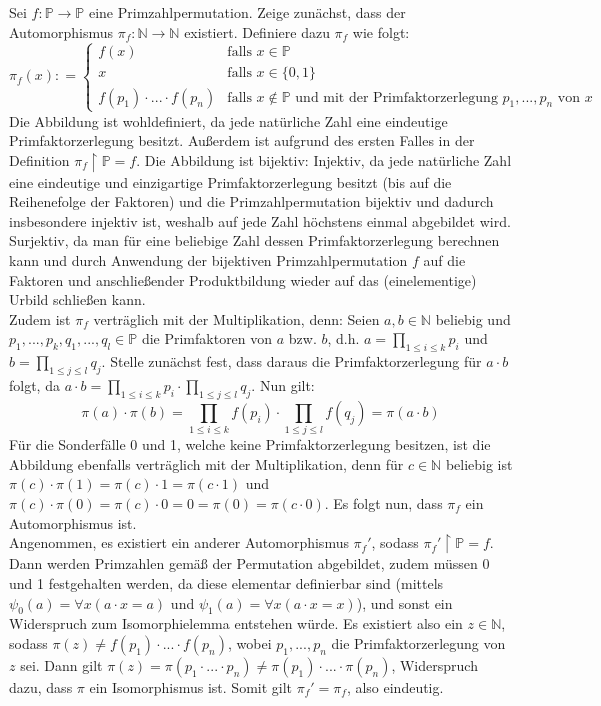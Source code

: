 \documentclass[11pt, a4paper]{article}
\newcommand{\defgr}{\mathrel{\mathop:\!\!=}}
\begin{document}
\begin{adjustwidth}{20pt}{20pt}
	Sei $f:\mathbb{P}\to \mathbb{P}$ eine Primzahlpermutation. Zeige zunächst, dass der Automorphismus $\pi_f:\mathbb{N} \to \mathbb{N}$ existiert. Definiere dazu $\pi_f$ wie
	folgt:
	\[
	\pi_f(x) \defgr 
	\begin{cases}
	f(x) & \text{falls $x\in \mathbb{P}$}\\
	x & \text{falls $x \in \{0,1\}$}\\
	f(p_1)\cdot...\cdot f(p_n) & \text{falls $x\notin \mathbb{P}$ und mit der Primfaktorzerlegung $p_1,...,p_n$ von $x$}
	\end{cases}
	\]
	Die Abbildung ist wohldefiniert, da jede natürliche Zahl eine eindeutige Primfaktorzerlegung besitzt. 
	Außerdem ist aufgrund des ersten Falles in der Definition $\pi_f \upharpoonright \mathbb{P}=f$. Die Abbildung ist bijektiv: Injektiv, da jede natürliche Zahl eine eindeutige und
	einzigartige Primfaktorzerlegung besitzt (bis auf die Reihenefolge der Faktoren) und die Primzahlpermutation bijektiv und dadurch insbesondere injektiv ist, weshalb auf jede Zahl
	höchstens einmal abgebildet wird. Surjektiv, da man für eine beliebige Zahl dessen Primfaktorzerlegung berechnen kann und durch Anwendung der bijektiven Primzahlpermutation $f$ auf die
	Faktoren und anschließender Produktbildung wieder auf das (einelementige) Urbild schließen kann.\\
	Zudem ist $\pi_f$ verträglich mit der Multiplikation, denn: Seien $a,b \in \mathbb{N}$ beliebig und $p_1,...,p_k,q_1,...,q_l \in \mathbb{P}$ die Primfaktoren von $a$ bzw. $b$, d.h.
	${\displaystyle a=\prod_{1 \leq i \leq k}p_i}$ und ${\displaystyle b=\prod_{1 \leq j \leq l}q_j}$. Stelle zunächst fest, dass daraus die Primfaktorzerlegung für $a \cdot b$ folgt, da
	$a \cdot b = {\displaystyle \prod_{1 \leq i \leq k}p_i} \cdot {\displaystyle \prod_{1 \leq j \leq l}q_j}$. Nun gilt:
	\[
	\pi(a) \cdot \pi(b) = \prod_{1 \leq i \leq k}f(p_i) \cdot \prod_{1 \leq j \leq l}f(q_j) = \pi(a \cdot b)
	\]
	Für die Sonderfälle 0 und 1, welche keine Primfaktorzerlegung besitzen, ist die Abbildung ebenfalls verträglich mit der Multiplikation, denn für $c \in \mathbb{N}$ beliebig ist
	$\pi(c) \cdot \pi(1) = \pi(c) \cdot 1 = \pi(c \cdot 1)$ und $\pi(c) \cdot \pi(0) = \pi(c) \cdot 0 = 0 = \pi(0) = \pi(c \cdot 0)$. Es folgt nun, dass $\pi_f$ ein Automorphismus ist.\\
	Angenommen, es existiert ein anderer Automorphismus $\pi_f'$, sodass $\pi_f' \upharpoonright \mathbb{P}=f$. Dann werden Primzahlen gemäß der Permutation abgebildet, zudem müssen 0 und
	1 festgehalten werden, da diese elementar definierbar sind (mittels $\psi_0(a)=\forall x(a\cdot x=a)$ und $\psi_1(a)=\forall x(a \cdot x=x)$), und sonst ein Widerspruch zum Isomorphielemma
	entstehen würde. Es existiert also ein $z \in \mathbb{N}$, sodass $\pi(z) \neq f(p_1)\cdot...\cdot f(p_n)$, wobei $p_1,...,p_n$ die Primfaktorzerlegung von $z$ sei. Dann gilt 
	$\pi(z)=\pi(p_1 \cdot ... \cdot p_n) \neq \pi(p_1) \cdot ... \cdot \pi(p_n)$, Widerspruch dazu, dass $\pi$ ein Isomorphismus ist. Somit gilt $\pi_f' = \pi_f$, also eindeutig. 
\end{adjustwidth}
\end{document}
